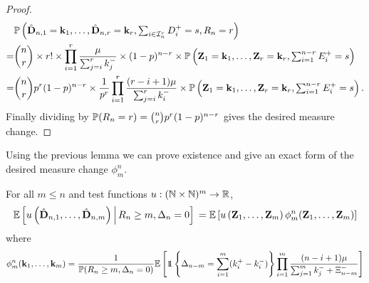 \begin{proof}
\begin{align*}
        & \P\left(\hat{\vD}_{n, 1} = \vk_1, \ldots, \hat{\vD}_{n, r} = \vk_r, \textstyle \sum_{i \in \cI_n^c} D_i^+ = s, R_n = r \right) \\
        =& \binom{n}{r} \times r!
        \times \prod_{i=1}^r \frac{\mu}{\sum_{j=i}^r k_j^-} \times (1-p)^{n-r}
        \times \P\left(\vZ_1 = \vk_1, \ldots, \vZ_r = \vk_r, \textstyle \sum_{i=1}^{n-r} E_i^+ = s \right) \\
        =& \binom{n}{r} p^r (1-p)^{n-r} \times \frac{1}{p^r} \prod_{i=1}^r \frac{(r-i+1) \mu}{\sum_{j=i}^r k_i^-}
        \times \P\left(\vZ_1 = \vk_1, \ldots, \vZ_r = \vk_r, \textstyle \sum_{i=1}^{n-r} E_i^+ = s \right).
    \end{align*}
    Finally dividing by $\P(R_n = r) = \binom{n}{r} p^r (1-p)^{n-r}$ gives the desired measure change.
\end{proof}

Using the previous lemma we can prove existence and give an exact form of the desired measure change $\phi^n_m$.

\begin{lemma}
    \label{lem:exact-measure-change}
    For all $m \leq n$ and test functions $u: (\N \times \N)^m \to \R$,
    \begin{equation*}
        \E \left[
            u\left( \hat{\vD}_{n, 1}, \ldots, \hat{\vD}_{n, m} \right)
            \,\middle\vert\,
            R_n \geq m,
            \Delta_n = 0
        \right] \\
        =
        \E \left[
            u\left( \vZ_1, \ldots, \vZ_m \right)
            \phi^n_m(\vZ_1, \ldots, \vZ_m)
        \right]
    \end{equation*}
    where
    \begin{align*}
        \phi^n_m(\vk_1, \ldots, \vk_m) =
        \frac{1}{\P(R_n \geq m, \Delta_n = 0)} \E\left[ 
            \one \left\{ \Delta_{n-m} = \sum_{i=1}^m (k_i^+ - k_i^-) \right\}
            \prod_{i=1}^m \frac{(n - i + 1) \mu}{\sum_{j=1}^m k_j^- + \Xi_{n-m}^-}
        \right]
    \end{align*}
\end{lemma}

